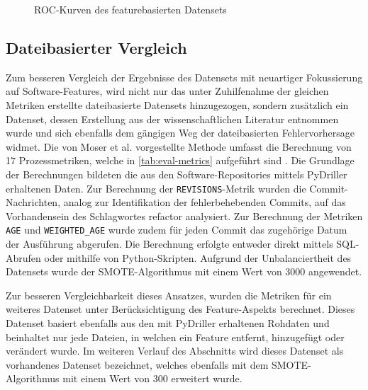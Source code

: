 \begin{figure}[t]
  \caption{ROC-Kurven des featurebasierten Datensets}
\end{figure}

\subsection{Dateibasierter Vergleich}
\label{classic-eval}

Zum besseren Vergleich der Ergebnisse des Datensets mit neuartiger Fokussierung auf Software-Features, wird nicht nur das unter Zuhilfenahme der gleichen Metriken erstellte dateibasierte Datensets hinzugezogen, sondern zusätzlich ein Datenset, dessen Erstellung aus der wissenschaftlichen Literatur entnommen wurde und sich ebenfalls dem gängigen Weg der dateibasierten Fehlervorhersage widmet. Die von Moser et al. vorgestellte Methode umfasst die Berechnung von 17 Prozessmetriken, welche in \autoref{tab:eval-metrics} aufgeführt sind \cite{Moser2008}. Die Grundlage der Berechnungen bildeten die aus den Software-Repositories mittels PyDriller erhaltenen Daten. Zur Berechnung der \texttt{REVISIONS}-Metrik wurden die Commit-Nachrichten, analog zur Identifikation der fehlerbehebenden Commits, auf das Vorhandensein des Schlagwortes \glqq refactor\grqq{} analysiert. Zur Berechnung der Metriken \texttt{AGE} und \texttt{WEIGHTED\_AGE} wurde zudem für jeden Commit das zugehörige Datum der Ausführung abgerufen. Die Berechnung erfolgte entweder direkt mittels SQL-Abrufen oder mithilfe von Python-Skripten. Aufgrund der Unbalanciertheit des Datensets wurde der SMOTE-Algorithmus mit einem Wert von 3000 angewendet.

Zur besseren Vergleichbarkeit dieses Ansatzes, wurden die Metriken für ein weiteres Datenset unter Berücksichtigung des Feature-Aspekts berechnet. Dieses Datenset basiert ebenfalls aus den mit PyDriller erhaltenen Rohdaten und beinhaltet nur jede Dateien, in welchen ein Feature entfernt, hinzugefügt oder verändert wurde. Im weiteren Verlauf des Abschnitts wird dieses Datenset als \glqq vorhandenes Datenset\grqq{} bezeichnet, welches ebenfalls mit dem SMOTE-Algorithmus mit einem Wert von 300 erweitert wurde.

